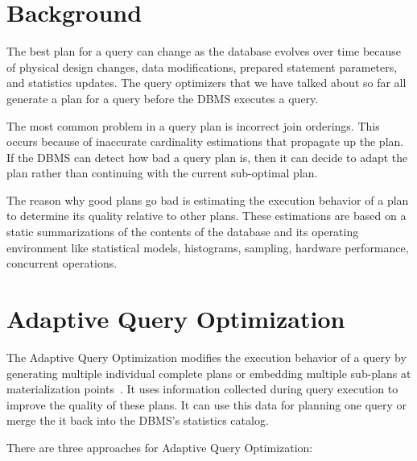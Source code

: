 \documentclass[11pt]{article}
\begin{document}
\maketitle
\thispagestyle{plain}

\section{Background}
The best plan for a query can change as the database evolves over time because of physical design changes, data modifications, prepared statement parameters, and statistics updates. The query optimizers that we have talked about so far all generate a plan for a query before the DBMS executes a query.

The most common problem in a query plan is incorrect join orderings. This occurs because of inaccurate cardinality estimations that propagate up the plan. If the DBMS can detect how bad a query plan is, then it can decide to adapt the plan rather than continuing with the current sub-optimal plan.

The reason why good plans go bad is estimating the execution behavior of a plan to determine its quality relative to other plans. These estimations are based on a static summarizations of the contents of the database and its operating environment like statistical models, histograms, sampling, hardware performance, concurrent operations.

\section{Adaptive Query Optimization}
The Adaptive Query Optimization modifies the execution behavior of a query by generating multiple individual complete plans or embedding multiple sub-plans at materialization points~\cite{Babu2005}. It uses information collected during query execution to improve the quality of these plans. It can use this data for planning one query or merge the it back into the DBMS's statistics catalog.

There are three approaches for Adaptive Query Optimization:

\end{document}
